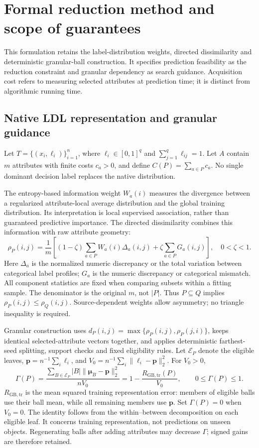 \section{Formal reduction method and scope of guarantees}
\label{sec:formal-method}
This formulation retains the label-distribution weights, directed dissimilarity and deterministic granular-ball construction. It specifies prediction feasibility as the reduction constraint and granular dependency as search guidance. Acquisition cost refers to measuring selected attributes at prediction time; it is distinct from algorithmic running time.

\subsection{Native LDL representation and granular guidance}
Let $T=\{(x_i,\boldsymbol\ell_i)\}_{i=1}^n$, where $\boldsymbol\ell_i\in[0,1]^q$ and $\sum_{j=1}^q\ell_{ij}=1$. Let $A$ contain $m$ attributes with finite costs $c_a>0$, and define $C(P)=\sum_{a\in P}c_a$. No single dominant decision label replaces the native distribution.

The entropy-based information weight $W_a(i)$ measures the divergence between a regularized attribute-local average distribution and the global training distribution. Its interpretation is local supervised association, rather than guaranteed predictive importance. The directed dissimilarity combines this information with raw attribute geometry:
\begin{equation}
 \rho_P(i,j)=\frac{1}{m}\left[(1-\zeta)\sum_{a\in P}W_a(i)\Delta_a(i,j)
 +\zeta\sum_{a\in P}G_a(i,j)\right],\quad 0<\zeta<1.
\end{equation}
Here $\Delta_a$ is the normalized numeric discrepancy or the total variation between categorical label profiles; $G_a$ is the numeric discrepancy or categorical mismatch. All component statistics are fixed when comparing subsets within a fitting sample. The denominator is the original $m$, not $|P|$. Thus $P\subseteq Q$ implies $\rho_P(i,j)\le\rho_Q(i,j)$. Source-dependent weights allow asymmetry; no triangle inequality is required.

Granular construction uses $d_P(i,j)=\max\{\rho_P(i,j),\rho_P(j,i)\}$, keeps identical selected-attribute vectors together, and applies deterministic farthest-seed splitting, support checks and fixed eligibility rules. Let $\mathcal E_P$ denote the eligible leaves, $\boldsymbol p=n^{-1}\sum_i\boldsymbol\ell_i$, and $V_0=n^{-1}\sum_i\|\boldsymbol\ell_i-\boldsymbol p\|_2^2$. For $V_0>0$,
\begin{equation}
 \Gamma(P)=\frac{\sum_{B\in\mathcal E_P}|B|\|\boldsymbol\mu_B-\boldsymbol p\|_2^2}{nV_0}
 =1-\frac{R_{\mathrm{GB,tr}}(P)}{V_0},\qquad 0\le\Gamma(P)\le1.
\end{equation}
$R_{\mathrm{GB,tr}}$ is the mean squared training representation error: members of eligible balls use their ball mean, while all remaining members use $\boldsymbol p$. Set $\Gamma(P)=0$ when $V_0=0$. The identity follows from the within--between decomposition on each eligible leaf. It concerns training representation, not predictions on unseen objects. Regenerating balls after adding attributes may decrease $\Gamma$; signed gains are therefore retained.

